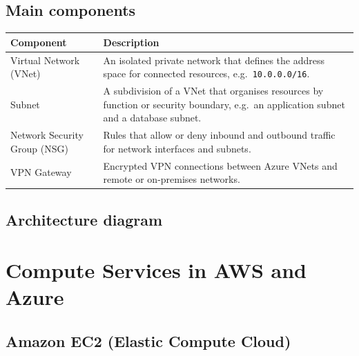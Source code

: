 \documentclass[11pt,a4paper]{article}
\begin{document}
\subsection{Main components}

\begin{tabularx}{\textwidth}{@{}lX@{}}
\toprule
\rowcolor{tablehead}\textbf{Component} & \textbf{Description} \\
\midrule
Virtual Network (VNet) & An isolated private network that defines the address space for
  connected resources, e.g.\ \texttt{10.0.0.0/16}. \\
\addlinespace
Subnet & A subdivision of a VNet that organises resources by function or security boundary,
  e.g.\ an application subnet and a database subnet. \\
\addlinespace
Network Security Group (NSG) & Rules that allow or deny inbound and outbound traffic for
  network interfaces and subnets. \\
\addlinespace
VPN Gateway & Encrypted VPN connections between Azure VNets and remote or on-premises
  networks. \\
\bottomrule
\end{tabularx}

\subsection{Architecture diagram}

\section{Compute Services in AWS and Azure}


\subsection{Amazon EC2 (Elastic Compute Cloud)}


\end{document}
